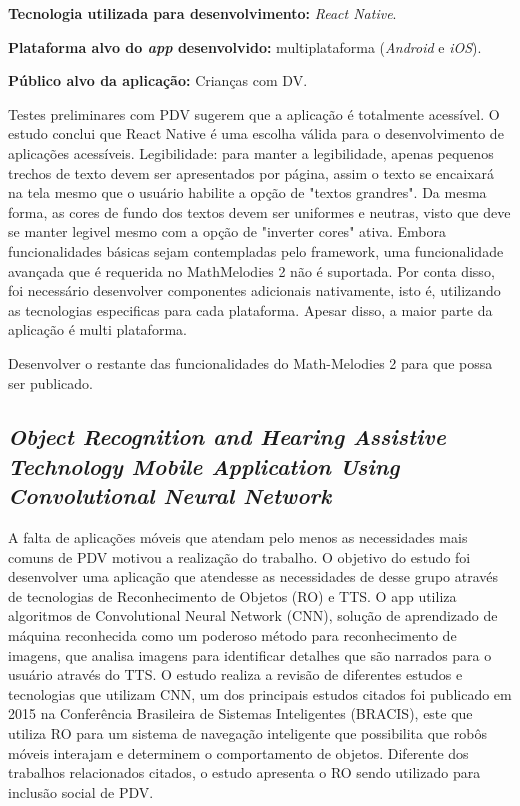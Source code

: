 \textbf{Tecnologia utilizada para desenvolvimento:} \emph{React Native}.

\textbf{Plataforma alvo do \emph{app} desenvolvido:} multiplataforma (\emph{Android} e \emph{iOS}).

\textbf{Público alvo da aplicação:} Crianças com DV\@.

Testes preliminares com PDV sugerem que a aplicação é totalmente acessível.
O estudo conclui que React Native é uma escolha válida para o desenvolvimento de aplicações acessíveis.
Legibilidade: para manter a legibilidade, apenas pequenos trechos de texto devem ser apresentados por página, assim o texto se encaixará na tela mesmo que o usuário habilite a opção de "textos grandres".
Da mesma forma, as cores de fundo dos textos devem ser uniformes e neutras, visto que deve se manter legivel mesmo com a opção de "inverter cores" ativa.
Embora funcionalidades básicas sejam contempladas pelo framework, uma funcionalidade avançada que é requerida no MathMelodies 2 não é suportada.
Por conta disso, foi necessário desenvolver componentes adicionais nativamente, isto é, utilizando as tecnologias especificas para cada plataforma.
Apesar disso, a maior parte da aplicação é multi plataforma.

Desenvolver o restante das funcionalidades do Math-Melodies 2 para que possa ser publicado.

\subsection{\emph{Object Recognition and Hearing Assistive Technology Mobile Application Using Convolutional Neural Network}}

A falta de aplicações móveis que atendam pelo menos as necessidades mais comuns de PDV motivou a realização do trabalho.
O objetivo do estudo foi desenvolver uma aplicação que atendesse as necessidades de desse grupo através de tecnologias de Reconhecimento de Objetos (RO) e TTS.
O app utiliza algoritmos de Convolutional Neural Network (CNN), solução de aprendizado de máquina reconhecida como um poderoso método para reconhecimento de imagens, que analisa imagens para identificar detalhes que são narrados para o usuário através do TTS.
O estudo realiza a revisão de diferentes estudos e tecnologias que utilizam CNN, um dos principais estudos citados foi publicado em 2015 na Conferência Brasileira de Sistemas Inteligentes (BRACIS), este que utiliza RO para um sistema de navegação inteligente que possibilita que robôs móveis interajam e determinem o comportamento de objetos.
Diferente dos trabalhos relacionados citados, o estudo apresenta o RO sendo utilizado para inclusão social de PDV.


